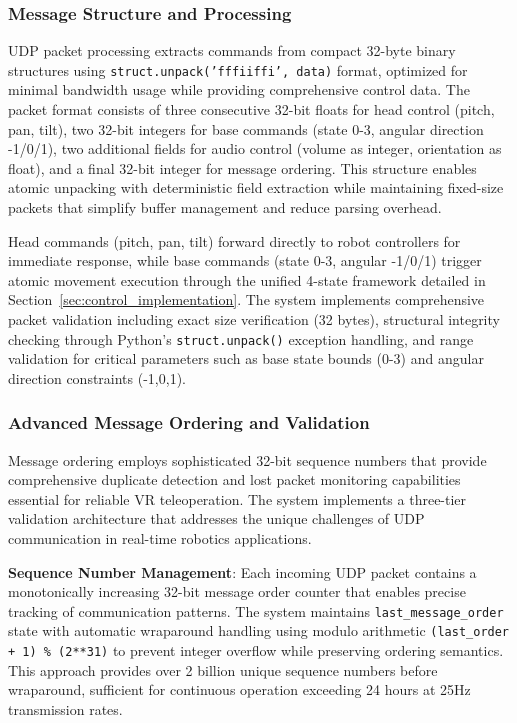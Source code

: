 \subsubsection{Message Structure and Processing}
UDP packet processing extracts commands from compact 32-byte binary structures using \texttt{struct.unpack('fffiiffi', data)} format, optimized for minimal bandwidth usage while providing comprehensive control data. The packet format consists of three consecutive 32-bit floats for head control (pitch, pan, tilt), two 32-bit integers for base commands (state 0-3, angular direction -1/0/1), two additional fields for audio control (volume as integer, orientation as float), and a final 32-bit integer for message ordering. This structure enables atomic unpacking with deterministic field extraction while maintaining fixed-size packets that simplify buffer management and reduce parsing overhead.

Head commands (pitch, pan, tilt) forward directly to robot controllers for immediate response, while base commands (state 0-3, angular -1/0/1) trigger atomic movement execution through the unified 4-state framework detailed in Section~\ref{sec:control_implementation}. The system implements comprehensive packet validation including exact size verification (32 bytes), structural integrity checking through Python's \texttt{struct.unpack()} exception handling, and range validation for critical parameters such as base state bounds (0-3) and angular direction constraints (-1,0,1).

\subsubsection{Advanced Message Ordering and Validation}

Message ordering employs sophisticated 32-bit sequence numbers that provide comprehensive duplicate detection and lost packet monitoring capabilities essential for reliable VR teleoperation. The system implements a three-tier validation architecture that addresses the unique challenges of UDP communication in real-time robotics applications.

\textbf{Sequence Number Management}: Each incoming UDP packet contains a monotonically increasing 32-bit message order counter that enables precise tracking of communication patterns. The system maintains \texttt{last\_message\_order} state with automatic wraparound handling using modulo arithmetic \texttt{(last\_order + 1) \% (2**31)} to prevent integer overflow while preserving ordering semantics. This approach provides over 2 billion unique sequence numbers before wraparound, sufficient for continuous operation exceeding 24 hours at 25Hz transmission rates.

